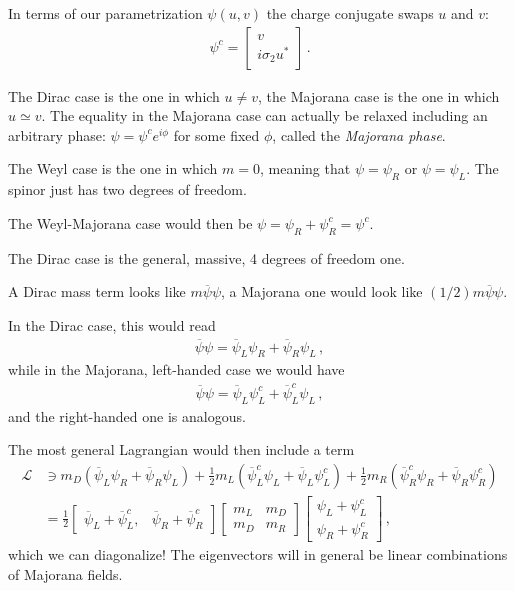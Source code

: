 \documentclass[main.tex]{subfiles}
\begin{document}
In terms of our parametrization \(\psi (u, v)\) the charge conjugate swaps \(u\) and \(v\):
%
\begin{align}
\psi^{c} = \left[\begin{array}{c}
v \\ 
i \sigma_2 u^{*}
\end{array}\right]
\,.
\end{align}

The Dirac case is the one in which \(u \neq v\), the Majorana case is the one in which \(u \simeq v\). 
The equality in the Majorana case can actually be relaxed including an arbitrary phase: 
\(\psi = \psi^{c} e^{i \phi }\) for some fixed \(\phi \), called the \emph{Majorana phase}.

The Weyl case is the one in which \(m = 0\), meaning that \(\psi = \psi _R\) or \(\psi = \psi _L\). 
The spinor just has two degrees of freedom. 

The Weyl-Majorana case would then be \(\psi = \psi _R + \psi _R^{c} = \psi^{c}\). 

The Dirac case is the general, massive, 4 degrees of freedom one. 

A Dirac mass term looks like \(m \overline{\psi} \psi\), 
a Majorana one would look like \((1/2) m \overline{\psi} \psi \).

In the Dirac case, this would read 
%
\begin{align}
\overline{\psi} \psi = \overline{\psi}_L \psi_R + \overline{\psi}_R \psi _L
\,,
\end{align}
%
while in the Majorana, left-handed case we would have 
%
\begin{align}
\overline{\psi} \psi = \overline{\psi}_L \psi _L^{c} + \overline{\psi}_L^{c} \psi _L
\,,
\end{align}
%
and the right-handed one is analogous. 

The most general Lagrangian would then include a term 
%
\begin{align}
\mathscr{L} &\ni m_D 
\left( 
    \overline{\psi}_L \psi _R + \overline{\psi}_R \psi _L
\right)
+ 
\frac{1}{2} m_L 
\left(
    \overline{\psi}_L^{c} \psi _L + \overline{\psi}_L \psi _L^{c}
\right)
+ 
\frac{1}{2} m_R
\left(
    \overline{\psi}_R^{c} \psi _R + \overline{\psi}_R \psi _R^{c}
\right)  \\
&= \frac{1}{2} \left[\begin{array}{cc}
\overline{\psi}_L + \overline{\psi}_L^{c}, &
\overline{\psi}_R + \overline{\psi}_R^{c}
\end{array}\right]
\left[\begin{array}{cc}
m_L & m_D \\ 
m_D & m_R
\end{array}\right]
\left[\begin{array}{c}
\psi _L + \psi_L^{c} \\ 
\psi _R + \psi _R^{c}
\end{array}\right]
\,,
\end{align}
%
which we can diagonalize! 
The eigenvectors will in general be linear combinations of Majorana fields. 
\end{document}
